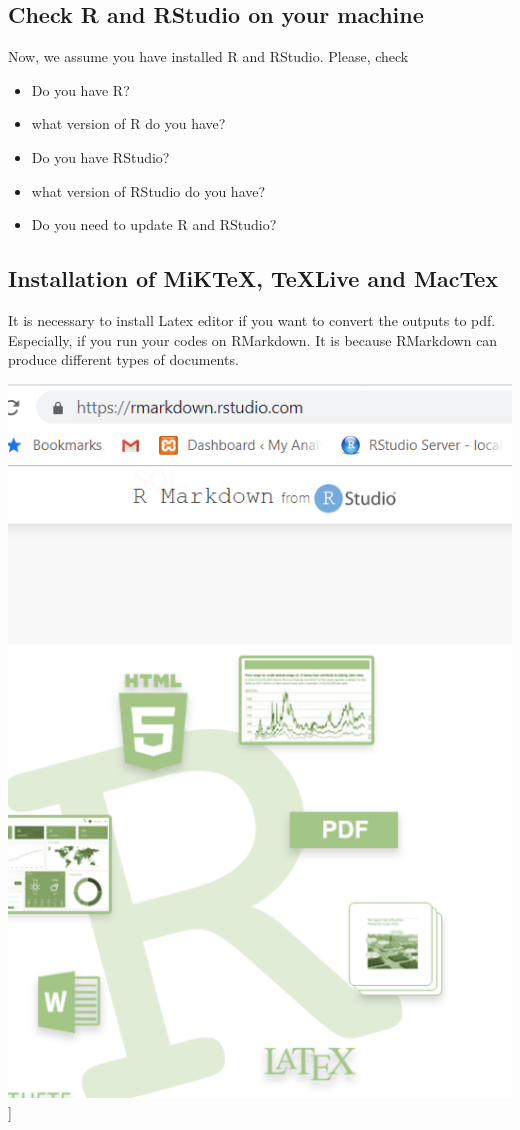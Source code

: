 \documentclass[
]{book}
\providecommand{\tightlist}{%
  \setlength{\itemsep}{0pt}\setlength{\parskip}{0pt}}
\begin{document}
\hypertarget{check-r-and-rstudio-on-your-machine}{%
\subsection{Check R and RStudio on your machine}\label{check-r-and-rstudio-on-your-machine}}

Now, we assume you have installed R and RStudio. Please, check

\begin{itemize}
\tightlist
\item
  Do you have R?
\item
  what version of R do you have?
\item
  Do you have RStudio?
\item
  what version of RStudio do you have?
\item
  Do you need to update R and RStudio?
\end{itemize}

\hypertarget{installation-of-miktex-texlive-and-mactex}{%
\subsection{Installation of MiKTeX, TeXLive and MacTex}\label{installation-of-miktex-texlive-and-mactex}}

It is necessary to install Latex editor if you want to convert the outputs to pdf. Especially, if you run your codes on RMarkdown. It is because RMarkdown can produce different types of documents.

\includegraphics{rmarkdown.PNG}{]}
\end{document}
